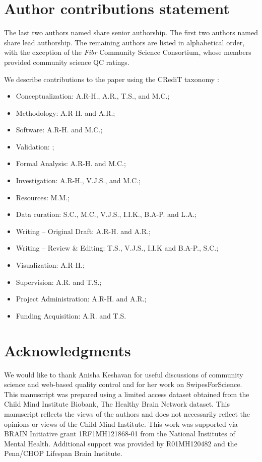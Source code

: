 \documentclass[9pt,lineno]{elife}
\begin{document}
\section{Author contributions statement}

The last two authors named share senior authorship. The first two authors named
share lead authorship. The remaining authors are listed in alphabetical order,
with the exception of the \emph{Fibr} Community Science Consortium, whose members
provided community science QC ratings.


We describe contributions to the paper using the CRediT taxonomy \citep{brand2015-vd,allen2014-oc}:
\begin{itemize}
    \item Conceptualization: A.R-H., A.R., T.S., and M.C.;
    \item Methodology: A.R-H. and A.R.;
    \item Software: A.R-H. and M.C.;
    \item Validation: ;
    \item Formal Analysis: A.R-H. and M.C.;
    \item Investigation: A.R-H., V.J.S., and M.C.;
    \item Resources: M.M.;
    \item Data curation: S.C., M.C., V.J.S., I.I.K., B.A-P. and L.A.;
    \item Writing – Original Draft: A.R-H. and A.R.;
    \item Writing – Review \& Editing: T.S., V.J.S., I.I.K and B.A-P., S.C.;
    \item Visualization: A.R-H.;
    \item Supervision: A.R. and T.S.;
    \item Project Administration: A.R-H. and A.R.;
    \item Funding Acquisition: A.R. and T.S.
\end{itemize}

\section{Acknowledgments}

We would like to thank Anisha Keshavan for useful discussions of community
science and web-based quality control and for her work on SwipesForScience. This
manuscript was prepared using a limited access dataset obtained from the Child
Mind Institute Biobank, The Healthy Brain Network dataset. This manuscript
reflects the views of the authors and does not necessarily reflect the opinions
or views of the Child Mind Institute. This work was supported via BRAIN Initiative grant 1RF1MH121868-01 from the National Institutes of Mental Health. Additional support was provided by R01MH120482 and the Penn/CHOP Lifespan Brain Institute. 
\end{document}
